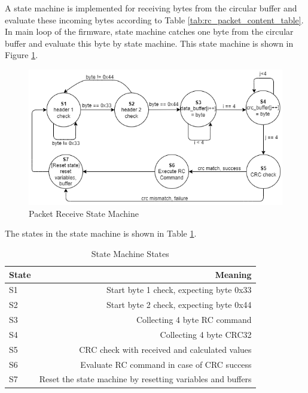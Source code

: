 A state machine is implemented for receiving bytes from the circular buffer and evaluate these incoming bytes according to Table \ref{tab:rc_packet_content_table}. In main loop of the firmware, state machine catches one byte from the circular buffer and evaluate this byte by state machine. This state machine is shown in Figure \ref{fig:rc_packet_fsm}. \\

\begin{figure}[!htbp]
    \centering
    \includegraphics[width=1\textwidth]{Imgs/fsm_uart.drawio.png}
    \caption{\label{fig:rc_packet_fsm}Packet Receive State Machine}
\end{figure}

The states in the state machine is shown in Table \ref{tab:rc_fsm_states}. \\

\begin{table}[!htbp]
    \centering
    \caption{\label{tab:rc_fsm_states}State Machine States}
    \begin{tabular}{l|r}
        State & Meaning \\\hline
        S1 & Start byte 1 check, expecting byte 0x33 \\
        S2 & Start byte 2 check, expecting byte 0x44 \\
        S3 & Collecting 4 byte RC command \\
        S4 & Collecting 4 byte CRC32 \\
        S5 & CRC check with received and calculated values \\
        S6 & Evaluate RC command in case of CRC success \\
        S7 & Reset the state machine by resetting variables and buffers \\
    \end{tabular}
\end{table}

